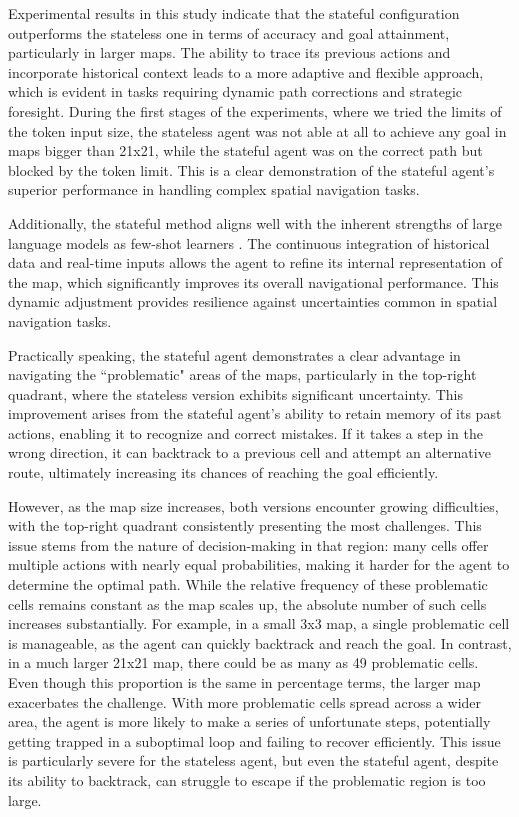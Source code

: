 Experimental results in this study indicate that the stateful configuration
outperforms the stateless one in terms of accuracy and goal attainment, particularly
in larger maps. The ability to trace its previous actions and incorporate
historical context leads to a more adaptive and flexible approach, which is evident
in tasks requiring dynamic path corrections and strategic foresight. During the
first stages of the experiments, where we tried the limits of the token input size,
the stateless agent was not able at all to achieve any goal in maps bigger than
21x21, while the stateful agent was on the correct path but blocked by the token
limit. This is a clear demonstration of the stateful agent's superior
performance in handling complex spatial navigation tasks.

Additionally, the stateful method aligns well with the inherent strengths of large
language models as few-shot learners \cite{brown2020languagemodelsfewshotlearners}.
The continuous integration of historical data and real-time inputs allows the
agent to refine its internal representation of the map, which significantly improves
its overall navigational performance. This dynamic adjustment provides
resilience against uncertainties common in spatial navigation tasks.

Practically speaking, the stateful agent demonstrates a clear advantage in navigating
the ``problematic" areas of the maps, particularly in the top-right quadrant,
where the stateless version exhibits significant uncertainty. This improvement arises
from the stateful agent's ability to retain memory of its past actions, enabling
it to recognize and correct mistakes. If it takes a step in the wrong direction,
it can backtrack to a previous cell and attempt an alternative route, ultimately
increasing its chances of reaching the goal efficiently.

However, as the map size increases, both versions encounter growing difficulties,
with the top-right quadrant consistently presenting the most challenges. This issue
stems from the nature of decision-making in that region: many cells offer
multiple actions with nearly equal probabilities, making it harder for the agent
to determine the optimal path. While the relative frequency of these problematic
cells remains constant as the map scales up, the absolute number of such cells increases
substantially. For example, in a small 3x3 map, a single problematic cell is
manageable, as the agent can quickly backtrack and reach the goal. In contrast, in
a much larger 21x21 map, there could be as many as 49 problematic cells. Even though
this proportion is the same in percentage terms, the larger map exacerbates the
challenge. With more problematic cells spread across a wider area, the agent is
more likely to make a series of unfortunate steps, potentially getting trapped in
a suboptimal loop and failing to recover efficiently. This issue is particularly
severe for the stateless agent, but even the stateful agent, despite its ability
to backtrack, can struggle to escape if the problematic region is too large.

